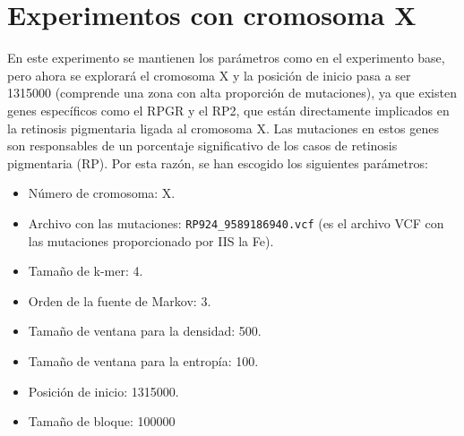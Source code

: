 \documentclass[11pt,spanish,listoffigures,listoftables]{tfgetsinf}
\begin{document}
\section{Experimentos con cromosoma X}

En este experimento se mantienen los parámetros como en el experimento base, pero ahora se explorará el cromosoma X y la posición de inicio pasa a ser 1315000 (comprende una zona con alta proporción de mutaciones), ya que existen genes específicos como el RPGR y el RP2, que están directamente implicados en la retinosis pigmentaria ligada al cromosoma X. Las mutaciones en estos genes son responsables de un porcentaje significativo de los casos de retinosis pigmentaria (\ac{RP}). Por esta razón, se han escogido los siguientes parámetros:

\begin{itemize}
   \item Número de cromosoma: X.
   \item Archivo con las mutaciones: \texttt{RP924\_9589186940.vcf}  (es el archivo \ac{VCF} con las mutaciones proporcionado por \ac{IIS} la Fe).
   \item Tamaño de k-mer: 4.
   \item Orden de la fuente de Markov: 3.
   \item Tamaño de ventana para la densidad: 500.
   \item Tamaño de ventana para la entropía: 100.
   \item Posición de inicio: 1315000.
   \item Tamaño de bloque: 100000 
\end{itemize}
\end{document}
